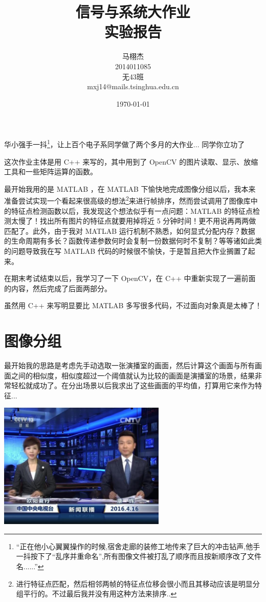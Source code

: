 \documentclass[a4paper, fontset=none]{article}
\title{信号与系统大作业\\实验报告}
\author{马栩杰\\2014011085\\无43班\\mxj14@mails.tsinghua.edu.cn}
\date{\today}
\begin{document}
\maketitle

华小强手一抖\footnote{``正在他小心翼翼操作的时候,宿舍走廊的装修工地传来了巨大的冲击钻声,他手一抖按下了“乱序并重命名”,所有图像文件被打乱了顺序而且按新顺序改了文件名......''}，让上百个电子系同学做了两个多月的大作业... 同学你立功了 \smiley

这次作业主体是用 C++ 来写的，其中用到了 OpenCV 的图片读取、显示、放缩工具和一些矩阵运算的函数。

最开始我用的是 MATLAB ，在 MATLAB 下愉快地完成图像分组以后，我本来准备尝试实现一个看起来很高级的想法\footnote{进行特征点匹配，然后相邻两帧的特征点位移会很小而且其移动应该是明显分组平行的。不过最后我并没有用这种方法来排序..}来进行帧排序，然而尝试调用了图像库中的特征点检测函数以后，我发现这个想法似乎有一点问题：MATLAB 的特征点检测太慢了！找出所有图片的特征点就要用掉将近 5 分钟时间！更不用说再两两做匹配了。此外，由于我对 MATLAB 运行机制不熟悉，如何显式分配内存？数据的生命周期有多长？函数传递参数何时会复制一份数据何时不复制？等等诸如此类的问题导致我在写 MATLAB 代码的时候很不愉快，于是暂且把大作业搁置了起来。

在期末考试结束以后，我学习了一下 OpenCV，在 C++ 中重新实现了一遍前面的内容，然后完成了后面两部分。

虽然用 C++ 来写明显要比 MATLAB 多写很多代码，不过面向对象真是太棒了！

\section{图像分组}
\label{sec:图像分组}

最开始我的思路是考虑先手动选取一张演播室的画面，然后计算这个画面与所有画面之间的相似度，相似度超过一个阈值就认为比较的画面是演播室的场景，结果非常轻松就成功了。在分出场景以后我求出了这些画面的平均值，打算用它来作为特征...

\begin{center}
  \includegraphics[width=0.6\textwidth]{./indoor_average.jpg}
\end{center}
\end{document}
